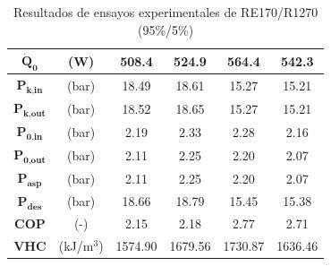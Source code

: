 \documentclass[../main.tex]{subfiles}
\begin{document}
\begin{table}[ht]
\begin{tabular}{cc|c|c|c|c|}
\hline
\multicolumn{1}{|c}{$\dot{\textbf{Q}}_\textbf{0}$} & (W) & 508.4 & 524.9 & 564.4 & 542.3 \\
\hline
\multicolumn{1}{|c}{$\textbf{P}_\textbf{k,in}$} & (bar) & 18.49 & 18.61 & 15.27 & 15.21 \\
\hline
\multicolumn{1}{|c}{$\textbf{P}_\textbf{k,out}$} & (bar) & 18.52 & 18.65 & 15.27 & 15.21 \\
\hline
\multicolumn{1}{|c}{$\textbf{P}_\textbf{0,in}$} & (bar) & 2.19 & 2.33 & 2.28 & 2.16 \\
\hline
\multicolumn{1}{|c}{$\textbf{P}_\textbf{0,out}$} & (bar) & 2.11 & 2.25 & 2.20 & 2.07 \\
\hline
\multicolumn{1}{|c}{$\textbf{P}_\textbf{asp}$} & (bar) & 2.11 & 2.25 & 2.20 & 2.07 \\
\hline
\multicolumn{1}{|c}{$\textbf{P}_\textbf{des}$} & (bar) & 18.66 & 18.79 & 15.45 & 15.38 \\
\hline
\multicolumn{1}{|c}{$\textbf{COP}$} & (-) & 2.15 & 2.18 & 2.77 & 2.71 \\
\hline
\multicolumn{1}{|c}{$\textbf{VHC}$} & (kJ/m$^3$) & 1574.90 & 1679.56 & 1730.87 & 1636.46 \\
\hline
\end{tabular}
\caption{\centering Resultados de ensayos experimentales de RE170/R1270 (95\%/5\%)}
\label{tab:RE170_R1270_95_5_anexo}
\end{table}
\end{document}
